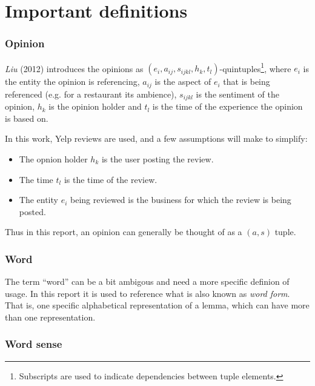 \documentclass[a4paper,11pt]{kth-mag}
\begin{document}
\section{Important definitions}

\subsubsection{Opinion}
\emph{Liu} (2012) introduces the opinions as $(e_i,a_{ij},s_{ijkl},h_k,t_l)$-quintuples\footnote{Subscripts are used to indicate dependencies between tuple elements.}, where $e_i$ is the entity the opinion is referencing, $a_{ij}$ is the aspect of $e_i$ that is being referenced (e.g. for a restaurant its ambience), $s_{ijkl}$ is the sentiment of the opinion, $h_k$ is the opinion holder and $t_l$ is the time of the experience the opinion is based on\cite[Chapter~2.1]{liu2012sentiment}.

In this work, Yelp reviews are used, and a few assumptions will make to simplify:
\begin{itemize}
\item The opnion holder $h_k$ is the user posting the review.
\item The time $t_l$ is the time of the review.
\item The entity $e_i$ being reviewed is the business for which the review is being posted.
\end{itemize}

Thus in this report, an opinion can generally be thought of as a $(a,s)$ tuple.

\subsubsection{Word}
The term ``word'' can be a bit ambigous and need a more specific definion of usage. In this report it is used to reference what is also known as \emph{word form}. That is, one specific alphabetical representation of a lemma, which can have more than one representation.

\subsubsection{Word sense}
\end{document}
